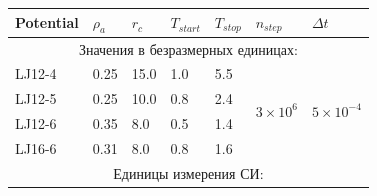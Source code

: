 \begin{table}[!t]
  \centering
  \begin{tabular}{|lllllcl|}
    \hline
    \multicolumn{1}{|l|}{Potential} & \multicolumn{1}{l|}{$\rho_a$}                      & \multicolumn{1}{l|}{$r_c$}          & \multicolumn{1}{l|}{$T_{start}$}      & \multicolumn{1}{l|}{$T_{stop}$}        & \multicolumn{1}{l|}{$n_{step}$}                       & $\Delta t$                          \\ \hline
    \multicolumn{7}{|c|}{Значения в безразмерных единицах:}                                                                                                                                                                                                                                                   \\ \hline
    \multicolumn{1}{|l|}{LJ12-4}    & \multicolumn{1}{l|}{0.25}                          & \multicolumn{1}{l|}{15.0}           & \multicolumn{1}{l|}{1.0}              & \multicolumn{1}{l|}{5.5}               & \multicolumn{1}{c|}{\multirow{4}{*}{$3 \times 10^6$}} & \multirow{4}{*}{$5 \times 10^{-4}$} \\ \cline{1-5}
    \multicolumn{1}{|l|}{LJ12-5}    & \multicolumn{1}{l|}{0.25}                          & \multicolumn{1}{l|}{10.0}           & \multicolumn{1}{l|}{0.8}              & \multicolumn{1}{l|}{2.4}               & \multicolumn{1}{c|}{}                                 &                                     \\ \cline{1-5}
    \multicolumn{1}{|l|}{LJ12-6}    & \multicolumn{1}{l|}{0.35}                          & \multicolumn{1}{l|}{8.0}            & \multicolumn{1}{l|}{0.5}              & \multicolumn{1}{l|}{1.4}               & \multicolumn{1}{c|}{}                                 &                                     \\ \cline{1-5}
    \multicolumn{1}{|l|}{LJ16-6}    & \multicolumn{1}{l|}{0.31}                          & \multicolumn{1}{l|}{8.0}            & \multicolumn{1}{l|}{0.8}              & \multicolumn{1}{l|}{1.6}               & \multicolumn{1}{c|}{}                                 &                                     \\ \hline
    \multicolumn{7}{|c|}{Единицы измерения СИ:}                                                                                                                                                                                                                                                               \\ \hline

\end{tabular}
\end{table}
